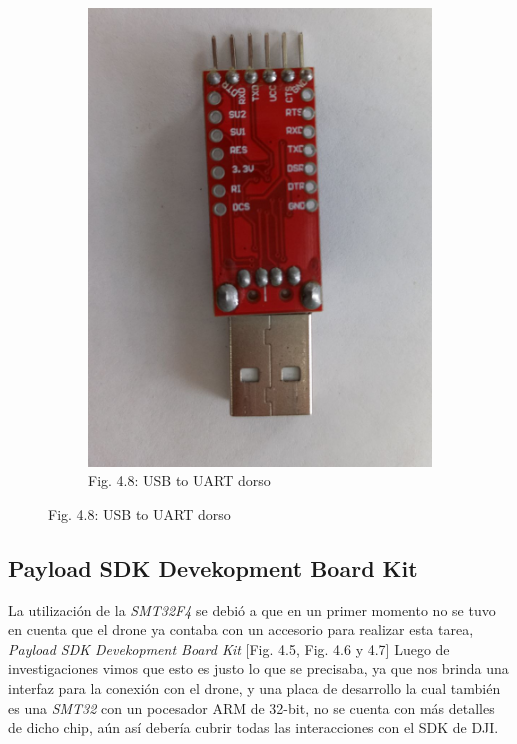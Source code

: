 \documentclass[12pt]{article}
\begin{document}
\begin{figure}[ht]
\begin{subfigure}[b]{0.45\linewidth}
    \includegraphics[width=\linewidth]{images/USB-UART-2.jpg}
    \caption{Fig. 4.8: USB to UART dorso}
  \end{subfigure}
\end{figure}

\subsection{Payload SDK Devekopment Board Kit}
La utilización de la \textit{SMT32F4} se debió a que en un primer momento no se tuvo en cuenta que el drone ya contaba con un accesorio para realizar esta tarea, {\textit{Payload SDK Devekopment Board Kit}} \cite{djiexp} [Fig. 4.5, Fig. 4.6 y 4.7]
Luego de investigaciones vimos que esto es justo lo que se precisaba, ya que nos brinda una interfaz para la conexión con el drone, y una placa de desarrollo la cual también es una \textit{SMT32} con un pocesador ARM de 32-bit, no se cuenta con más detalles de dicho chip, aún así debería cubrir todas las interacciones con el SDK de DJI.
\end{document}
